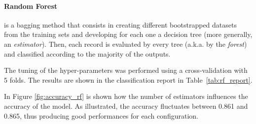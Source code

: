 \documentclass[10pt, a4paper, twocolumn]{article}
\begin{document}
\paragraph{Random Forest}
is a bagging method that consists in creating different bootstrapped datasets from the training sets and developing for each one a decision tree (more generally, an \textit{estimator}). Then, each record is evaluated by every tree (a.k.a. by the \textit{forest}) and classified according to the majority of the outputs.

The tuning of the hyper-parameters was performed using a cross-validation with 5 folds. The results are shown in the classification report in Table~\ref{tab:rf_report}.

In Figure \ref{fig:accuracy_rf} is shown how the number of estimators influences the accuracy of the model. As illustrated, the accuracy fluctuates between 0.861 and 0.865, thus producing good performances for each configuration.
\end{document}
